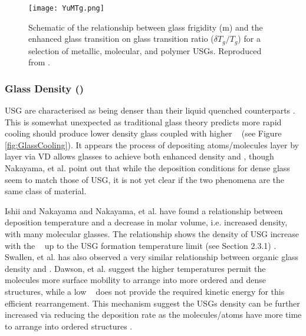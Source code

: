 \documentclass[draft,a4paper,12pt,oneside]{report}%
\begin{document}
\begin{figure}[htbp]
	\centering
	\texttt{[image: YuMTg.png]}
	\caption[\dTg~ and Frigidity Relationship]{Schematic of the relationship between glass frigidity (m) and the enhanced glass transition on glass transition ratio ($\delta T_{g}/T_{g}$) for a selection of metallic, molecular, and polymer USGs. Reproduced from \cite{Yu2013}.}
	\label{fig:YuMTgPlot}
\end{figure}

\subsubsection{Glass Density (\p)} 
USG are characterised as being denser than their liquid quenched counterparts \cite{Wang2014}. This is somewhat unexpected as traditional glass theory predicts more rapid cooling should produce lower density glass coupled with higher \Tg~ (see Figure \ref{fig:GlassCooling}). It appears the process of depositing atoms/molecules layer by layer via VD allows glasses to achieve both enhanced density and \Tg, though Nakayama, et al. \cite{Nakayama2013} point out that while the deposition conditions for dense glass seem to match those of USG, it is not yet clear if the two phenomena are the same class of material.

Ishii and Nakayama \cite{Ishii2014} and Nakayama, et al. \cite{Nakayama2013} have found a relationship between deposition temperature and a decrease in molar volume, i.e. increased density, with many molecular glasses. The relationship shows the density of USG increase with the \Tsub~ up to the USG formation temperature limit (see Section 2.3.1) \cite{Ishii2014, Nakayama2013}. Swallen, et al. \cite{Swallen2007} has also observed a very similar relationship between organic glass density and \Tsub. Dawson, et al. \cite{Dawson2010} suggest the higher temperatures permit the molecules more surface mobility to arrange into more ordered and dense structures, while a low \Tsub~ does not provide the required kinetic energy for this efficient rearrangement. This mechanism suggest the USGs density can be further increased via reducing the deposition rate as the molecules/atoms have more time to arrange into ordered structures \cite{Dawson2010}.
\end{document}
